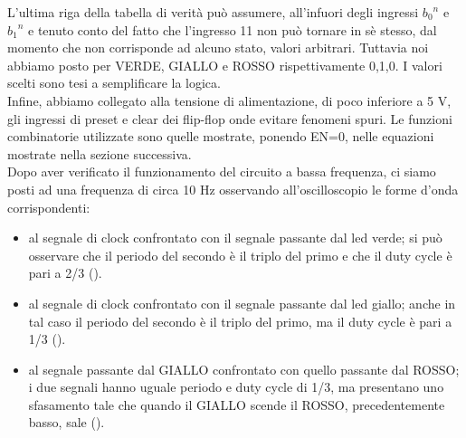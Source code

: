 L'ultima riga della tabella di verità può assumere, all'infuori degli ingressi ${b_0}^{n}$ e ${b_1}^{n}$ e tenuto conto del fatto che l'ingresso 11 non può tornare in sè stesso, dal momento che non corrisponde ad alcuno stato, valori arbitrari. Tuttavia noi abbiamo posto per VERDE, GIALLO e ROSSO rispettivamente 0,1,0. I valori scelti sono tesi a semplificare la logica.\\ Infine, abbiamo collegato alla tensione di alimentazione, di poco inferiore a 5 V, gli ingressi di preset e clear dei flip-flop onde evitare fenomeni spuri. Le funzioni combinatorie utilizzate sono quelle mostrate, ponendo EN=0, nelle equazioni mostrate nella sezione successiva.\\
Dopo aver verificato il funzionamento del circuito a bassa frequenza, ci siamo posti ad una frequenza di circa 10 Hz osservando all'oscilloscopio le forme d'onda corrispondenti:
\begin{itemize}
\item al segnale di clock confrontato con il segnale passante dal led verde; si può osservare che il periodo del secondo è il triplo del primo e che il duty cycle è pari a 2/3 ().
\item al segnale di clock confrontato con il segnale passante dal led giallo; anche in tal caso il periodo del secondo è il triplo del primo, ma il duty cycle è pari a 1/3 ().
\item al segnale passante dal GIALLO confrontato con quello passante dal ROSSO; i due segnali hanno uguale periodo e duty cycle di 1/3, ma presentano uno sfasamento tale che quando il GIALLO scende il ROSSO, precedentemente basso, sale ().
\end{itemize}

